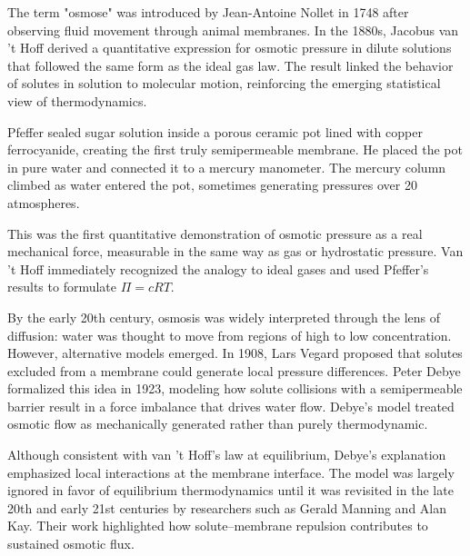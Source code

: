 \begin{historical}
The term "osmose" was introduced by Jean-Antoine Nollet in 1748 after observing fluid movement through animal membranes. In the 1880s, Jacobus van 't Hoff derived a quantitative expression for osmotic pressure in dilute solutions that followed the same form as the ideal gas law. The result linked the behavior of solutes in solution to molecular motion, reinforcing the emerging statistical view of thermodynamics.

Pfeffer sealed sugar solution inside a porous ceramic pot lined with copper ferrocyanide, creating the first truly semipermeable membrane. He placed the pot in pure water and connected it to a mercury manometer. The mercury column climbed as water entered the pot, sometimes generating pressures over 20 atmospheres.

This was the first quantitative demonstration of osmotic pressure as a real mechanical force, measurable in the same way as gas or hydrostatic pressure. Van 't Hoff immediately recognized the analogy to ideal gases and used Pfeffer's results to formulate $\Pi = cRT$.

By the early 20th century, osmosis was widely interpreted through the lens of diffusion: water was thought to move from regions of high to low concentration. However, alternative models emerged. In 1908, Lars Vegard proposed that solutes excluded from a membrane could generate local pressure differences. Peter Debye formalized this idea in 1923, modeling how solute collisions with a semipermeable barrier result in a force imbalance that drives water flow. Debye's model treated osmotic flow as mechanically generated rather than purely thermodynamic.

Although consistent with van ’t Hoff’s law at equilibrium, Debye’s explanation emphasized local interactions at the membrane interface. The model was largely ignored in favor of equilibrium thermodynamics until it was revisited in the late 20th and early 21st centuries by researchers such as Gerald Manning and Alan Kay. Their work highlighted how solute–membrane repulsion contributes to sustained osmotic flux.
\end{historical}
